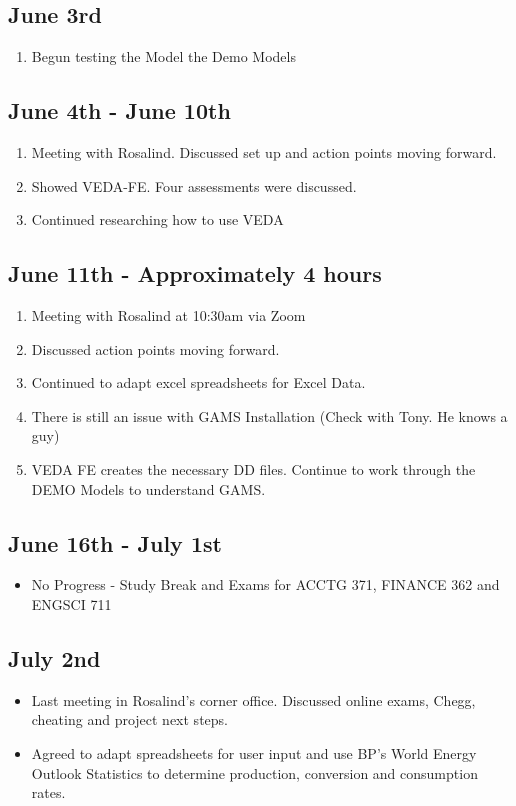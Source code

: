 \documentclass[12pt]{article}
\begin{document}
\subsection*{June 3rd}
\begin{enumerate}
	\item Begun testing the Model the Demo Models
\end{enumerate}
\subsection*{June 4th - June 10th}
\begin{enumerate}
	\item Meeting with Rosalind. Discussed set up and action points moving forward.
	\item Showed VEDA-FE. Four assessments were discussed.
	\item Continued researching how to use VEDA
\end{enumerate}
\subsection*{June 11th - Approximately 4 hours}
\begin{enumerate}
	\item Meeting with Rosalind at 10:30am via Zoom
	\item Discussed action points moving forward.
	\item Continued to adapt excel spreadsheets for Excel Data.
	\item There is still an issue with GAMS Installation (Check with Tony. He knows a guy)
	\item VEDA FE creates the necessary DD files. Continue to work through the DEMO Models to understand GAMS.
\end{enumerate}
\subsection*{June 16th - July 1st}
\begin{itemize}
	\item No Progress - Study Break and Exams for ACCTG 371, FINANCE 362 and ENGSCI 711
\end{itemize}
\subsection*{July 2nd}
\begin{itemize}
	\item Last meeting in Rosalind's corner office. Discussed online exams, Chegg, cheating and project next steps.
	\item Agreed to adapt spreadsheets for user input and use BP's World Energy Outlook Statistics to determine production, conversion and consumption rates.
\end{itemize}
\end{document}
